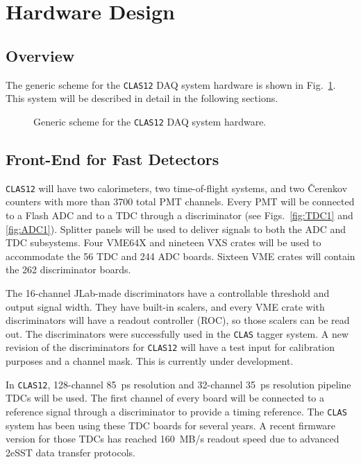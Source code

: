 \section{Hardware Design}

\subsection{Overview}

The generic scheme for the {\tt CLAS12} DAQ system hardware is shown in 
Fig.~\ref{fig:HARDWARE1}.  This system will be described in detail in 
the following sections.

\begin{figure}[ht]
\vspace{130mm}
\caption{\small{Generic scheme for the {\tt CLAS12} DAQ system hardware.}}
\label{fig:HARDWARE1} 
\end{figure}

\subsection{Front-End for Fast Detectors}

{\tt CLAS12} will have two calorimeters, two time-of-flight systems, and 
two {\v C}erenkov counters with more than 3700 total PMT channels. Every 
PMT will be connected to a Flash ADC and to a TDC through a discriminator 
(see Figs.~\ref{fig:TDC1} and \ref{fig:ADC1}).  Splitter panels will be used 
to deliver signals to both the ADC and TDC subsystems.  Four VME64X and 
nineteen VXS crates will be used to accommodate the 56 TDC and 244 ADC boards. 
Sixteen VME crates will contain the 262 discriminator boards.

The 16-channel JLab-made discriminators have a controllable threshold and 
output signal width.  They have built-in scalers, and every VME crate with
discriminators will have a readout controller (ROC), so those scalers can be 
read out.  The discriminators were successfully used in the {\tt CLAS} 
tagger system.  A new revision of the discriminators for {\tt CLAS12} will 
have a test input for calibration purposes and a channel mask.  This is
currently under development.

In {\tt CLAS12}, 128-channel 85~ps resolution and 32-channel 35~ps resolution 
pipeline TDCs will be used.  The first channel of every board will be 
connected to a reference signal through a discriminator to provide a timing 
reference.  The {\tt CLAS} system has been using these TDC boards for several 
years.  A recent firmware version for those TDCs has reached 160~MB/s
readout speed due to advanced 2eSST data transfer protocols.

